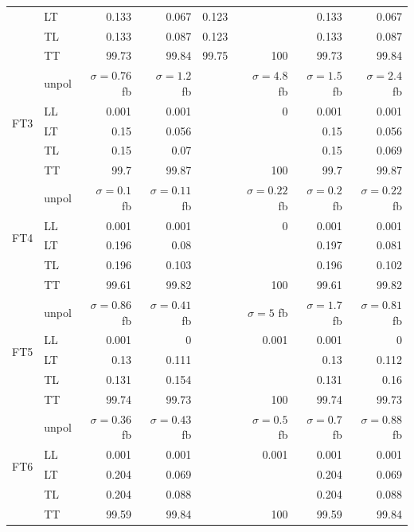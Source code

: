 \begin{table}[h]
{\begin{tabular}{llrrrrrr}
 & LT & \num{0.133} & \num{0.067} & \num{0.123} &  & \num{0.133} & \num{0.067} \\
 & TL & \num{0.133} & \num{0.087} & \num{0.123} &  & \num{0.133} & \num{0.087} \\
 & TT & \num{99.73} & \num{99.84} & \num{99.75} & \num{100} & \num{99.73} & \num{99.84} \\
\midrule
\multirow{5}{*}{FT3}
 & unpol & $\sigma = \num{0.76}$ fb & $\sigma = \num{1.2}$ fb &  & $\sigma = \num{4.8}$ fb & $\sigma = \num{1.5}$ fb & $\sigma = \num{2.4}$ fb \\
 & LL & \num{0.001} & \num{0.001} &  & \num{0} & \num{0.001} & \num{0.001} \\
 & LT & \num{0.15} & \num{0.056} &  &  & \num{0.15} & \num{0.056} \\
 & TL & \num{0.15} & \num{0.07} &  &  & \num{0.15} & \num{0.069} \\
 & TT & \num{99.7} & \num{99.87} &  & \num{100} & \num{99.7} & \num{99.87} \\
\midrule
\multirow{5}{*}{FT4}
 & unpol & $\sigma = \num{0.1}$ fb & $\sigma = \num{0.11}$ fb &  & $\sigma = \num{0.22}$ fb & $\sigma = \num{0.2}$ fb & $\sigma = \num{0.22}$ fb \\
 & LL & \num{0.001} & \num{0.001} &  & \num{0} & \num{0.001} & \num{0.001} \\
 & LT & \num{0.196} & \num{0.08} &  &  & \num{0.197} & \num{0.081} \\
 & TL & \num{0.196} & \num{0.103} &  &  & \num{0.196} & \num{0.102} \\
 & TT & \num{99.61} & \num{99.82} &  & \num{100} & \num{99.61} & \num{99.82} \\
\midrule
\multirow{5}{*}{FT5}
 & unpol & $\sigma = \num{0.86}$ fb & $\sigma = \num{0.41}$ fb &  & $\sigma = \num{5}$ fb & $\sigma = \num{1.7}$ fb & $\sigma = \num{0.81}$ fb \\
 & LL & \num{0.001} & \num{0} &  & \num{0.001} & \num{0.001} & \num{0} \\
 & LT & \num{0.13} & \num{0.111} &  &  & \num{0.13} & \num{0.112} \\
 & TL & \num{0.131} & \num{0.154} &  &  & \num{0.131} & \num{0.16} \\
 & TT & \num{99.74} & \num{99.73} &  & \num{100} & \num{99.74} & \num{99.73} \\
\midrule
\multirow{5}{*}{FT6}
 & unpol & $\sigma = \num{0.36}$ fb & $\sigma = \num{0.43}$ fb &  & $\sigma = \num{0.5}$ fb & $\sigma = \num{0.7}$ fb & $\sigma = \num{0.88}$ fb \\
 & LL & \num{0.001} & \num{0.001} &  & \num{0.001} & \num{0.001} & \num{0.001} \\
 & LT & \num{0.204} & \num{0.069} &  &  & \num{0.204} & \num{0.069} \\
 & TL & \num{0.204} & \num{0.088} &  &  & \num{0.204} & \num{0.088} \\
 & TT & \num{99.59} & \num{99.84} &  & \num{100} & \num{99.59} & \num{99.84} \\
\bottomrule
\end{tabular}
}%
\end{table}